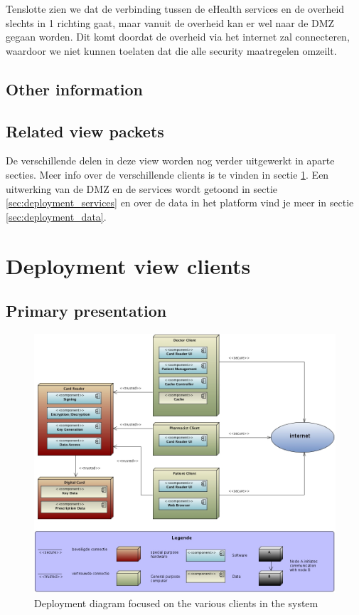 \documentclass[a4paper,10pt]{article}
\begin{document}
Tenslotte zien we dat de verbinding tussen de eHealth services en de overheid slechts in 1 richting gaat, maar vanuit de overheid kan er wel naar de DMZ gegaan worden. Dit komt doordat de overheid via het internet zal connecteren, waardoor we niet kunnen toelaten dat die alle security maatregelen omzeilt.

\subsection{Other information}

\subsection{Related view packets}

De verschillende delen in deze view worden nog verder uitgewerkt in aparte secties. Meer info over de verschillende clients is te vinden in sectie \ref{sec:deployment_clients}. Een uitwerking van de DMZ en de services wordt getoond in sectie \ref{sec:deployment_services} en over de data in het platform vind je meer in sectie \ref{sec:deployment_data}.

\section{Deployment view clients}
\label{sec:deployment_clients}

\subsection{Primary presentation}

\begin{figure}[!h]
  \includegraphics[width=\textwidth]{../images/deployment_clients.jpg}
    \caption{Deployment diagram focused on the various clients in the system}
\end{figure}
\end{document}

